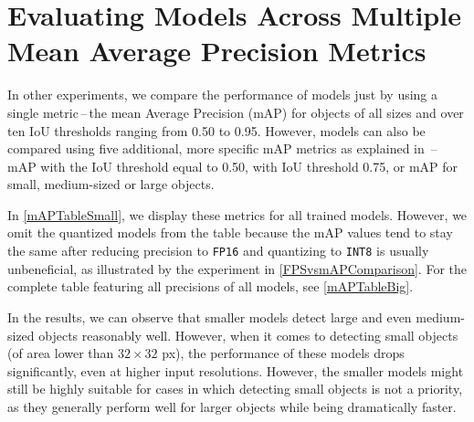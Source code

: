 \section{Evaluating Models Across Multiple Mean Average Precision Metrics}

In other experiments, we compare the performance of models just by
using a single metric\,--\,the mean Average Precision (mAP) for objects of all
sizes and over ten IoU thresholds ranging from \num{0.50} to \num{0.95}.
However, models can also be compared using five additional, more specific mAP
metrics as explained in \,--\,mAP with the IoU
threshold equal to \num{0.50}, with IoU threshold \num{0.75}, or mAP for small,
medium-sized or large objects.

In \autoref{mAPTableSmall}, we display these metrics for all trained models.
However, we omit the quantized models from the table because the mAP values tend
to stay the same after reducing precision to \texttt{FP16} and quantizing to
\texttt{INT8} is usually unbeneficial, as illustrated by the experiment in
\autoref{FPSvsmAPComparison}. For the complete table featuring all precisions of
all models, see \autoref{mAPTableBig}.

In the results, we can observe that smaller models detect large and even
medium-sized objects reasonably well. However, when it comes to detecting small
objects (of area lower than $32 \times 32$ px), the performance of these models
drops significantly, even at higher input resolutions. However, the smaller
models might still be highly suitable for cases in which detecting small objects
is not a priority, as they generally perform well for larger objects while being
dramatically faster.

